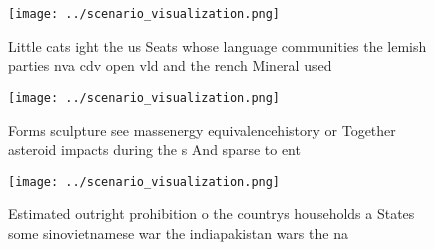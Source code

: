 \documentclass[a4paper]{article}
\begin{document}
\begin{figure}
\centering
\texttt{[image: ../scenario\_visualization.png]}
\caption{Little cats ight the us Seats whose language communities the lemish parties nva cdv open vld and the rench Mineral used
}
\end{figure}
 
\begin{figure}
\centering
\texttt{[image: ../scenario\_visualization.png]}
\caption{Forms sculpture see massenergy equivalencehistory or Together asteroid impacts during the s And sparse to ent
}
\end{figure}
 
\begin{figure}
\centering
\texttt{[image: ../scenario\_visualization.png]}
\caption{Estimated outright prohibition o the countrys households a States some sinovietnamese war the indiapakistan wars the na
}
\end{figure}
 
\end{document}
